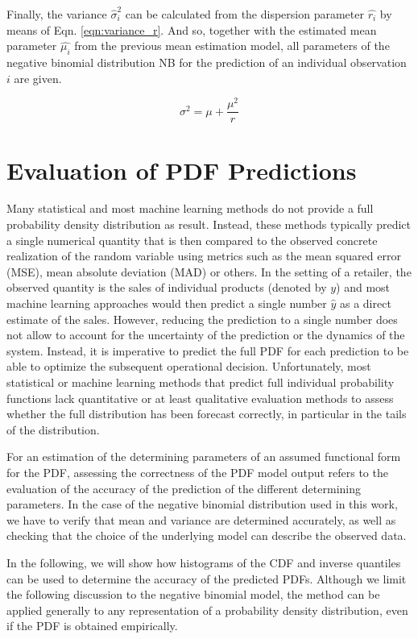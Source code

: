 \documentclass[BCOR=1mm, DIV=calc,10pt,
twoside=true,
twocolumn,
headings=normal]{scrartcl}
\newcommand{\eqn}{Eqn. }
\begin{document}
Finally, the variance $\hat{\sigma}^2_i$ can be calculated from the dispersion parameter $\hat{r_i}$ by means of \eqn \eqref{eqn:variance_r}. And so, together with the estimated mean parameter $\hat{\mu_i}$ from the previous mean estimation model, all parameters of the negative binomial distribution NB for the prediction of an individual observation $i$ are given.

\begin{equation} \label{eqn:variance_r}
\sigma^2 = \mu + \frac{\mu^2}{r}
\end{equation}


\section{Evaluation of PDF Predictions}
\label{sec:pdfEvaluation}

Many statistical and most machine learning methods do not provide a full probability density distribution as result. Instead, these methods typically predict a single numerical quantity that is then compared to the observed concrete realization of the random variable using metrics such as the mean squared error (MSE),  mean absolute deviation (MAD) or others. In the setting of a retailer, the observed quantity is the sales of individual products (denoted by $y$) and most machine learning approaches would then predict a single number $\hat{y}$ as a direct estimate of the sales. However, reducing the prediction to a single number does not allow to account for the uncertainty of the prediction or the dynamics of the system. Instead, it is imperative to predict the full PDF for each prediction to be able to optimize the subsequent operational decision. Unfortunately, most statistical or machine learning methods that predict full individual probability functions lack quantitative or at least qualitative evaluation methods to assess whether the full distribution has been forecast correctly, in particular in the tails of the distribution.

For an estimation of the determining parameters of an assumed functional form for the PDF, assessing the correctness of the PDF model output refers to the evaluation of the accuracy of the prediction of the different determining parameters. In the case of the negative binomial distribution used in this work, we have to verify that mean and variance are determined accurately, as well as checking that the choice of the underlying model can describe the observed data.

In the following, we will show how histograms of the CDF and inverse quantiles can be used to determine the accuracy of the predicted PDFs. Although we limit the following discussion to the negative binomial model, the method can be applied generally to any representation of a probability density distribution, even if the PDF is obtained empirically.
\end{document}
